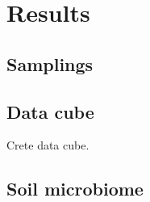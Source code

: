 \section{Results}\label{integration_results}


\subsection{Samplings}



\subsection{Data cube}

Crete data cube.


\subsection{Soil microbiome}\label{soil_microbiome}

